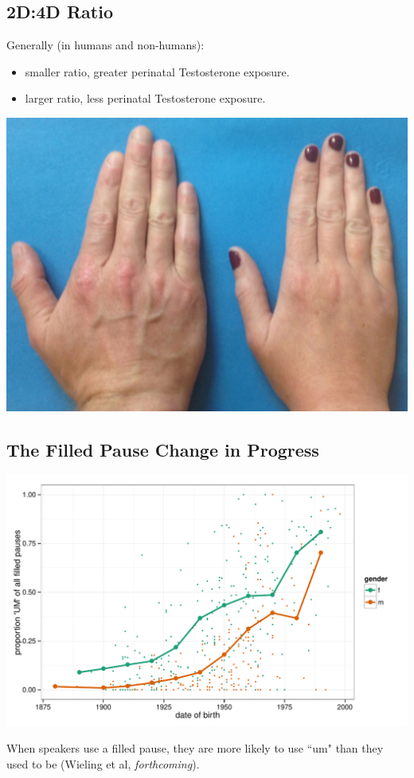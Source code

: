 \documentclass[a0,portrait]{a0poster}
\begin{document}
\begin{multicols}{2}
\subsection*{2D:4D Ratio}
Generally (in humans and non-humans):

\begin{itemize}
	\item smaller ratio, greater perinatal Testosterone exposure.
	\item larger ratio, less perinatal Testosterone exposure.
\end{itemize}
\begin{center}\vspace{1cm}
\includegraphics[width=0.8\linewidth]{realhands.png}
\end{center}\vspace{1cm}


\subsection*{The Filled Pause Change in Progress}
\begin{minipage}[c]{0.70\linewidth}
\includegraphics[width=1\linewidth]{um.pdf}
\end{minipage}
%
\begin{minipage}[c]{0.25\linewidth}
\large
When speakers use a filled pause, they are more likely to use ``um" than they used to be  (Wieling et al, \textsl{forthcoming}).
\end{minipage}





\end{multicols}
\end{document}
